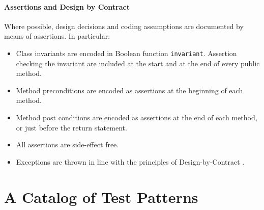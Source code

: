 \documentclass{article}
\begin{document}
\paragraph{Assertions and Design by Contract}
Where possible, design decisions and coding assumptions are documented
by means of assertions. In particular:
\begin{itemize}
\item Class invariants are encoded in Boolean function \texttt{invariant}.
  Assertion checking the invariant are included at the start and at the
  end of every public method.
\item Method preconditions are encoded as assertions at the beginning
  of each method.
\item Method post conditions are encoded as assertions at the end of
  each method, or just before the return statement.
\item All assertions are side-effect free.
\item \begin{sloppypar}
  Exceptions are thrown in line with the principles of Design-by-Contract
  \cite{Meyer:1992}.
  \end{sloppypar}
\end{itemize}





\setcounter{patterncnt}{-1}

\newcommand{\entry}[1]{\item \emph{#1}:\ }
\newcommand{\pattern}[1]{
 \refstepcounter{patterncnt}
 \paragraph{Pattern \thepatterncnt: #1}
}
\newcommand{\model}{\entry{Model Under Analysis}}
\newcommand{\faults}{\entry{Fault Model}}
\newcommand{\adequacy}{\entry{Adequacy}}
\newcommand{\strategy}{\entry{Test Strategy}}

\section{A Catalog of Test Patterns} \label{Patterns}
\end{document}
